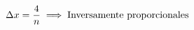 \documentclass[preview]{standalone}
\begin{document}
\begin{align*}
\special{dvisvgm:raw <g id='unique000'>}\Delta x = \frac{4}{n} \implies \text{Inversamente proporcionales}\special{dvisvgm:raw </g>}
\end{align*}
\end{document}
